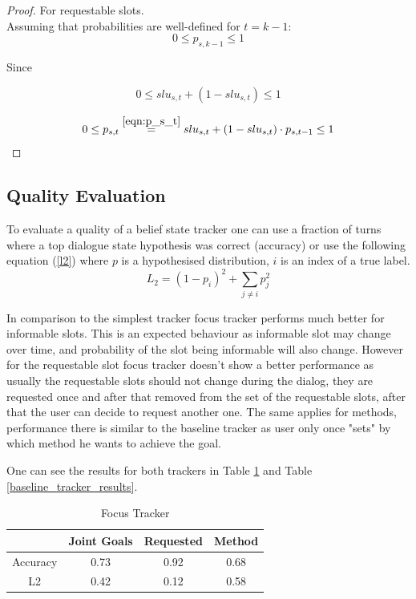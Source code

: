 \documentclass[12pt,titlepage,a4paper]{article}
\begin{document}
\begin{proof}
    For requestable slots.\\
    
    Assuming that probabilities are well-defined for $t = k-1$:
    \begin{equation}
        0 \leq p_{s,k-1} \leq 1
    \end{equation}
    
    Since
    
    \begin{equation}
        0 \leq slu_{s,t} + (1 - slu_{s,t}) \leq 1
    \end{equation}

    \begin{equation}
        0 \leq p_{s,t} \overset{\ref{eqn:p_s_t}}{=} slu_{s,t} + (1 - slu_{s,t}) \cdot p_{s,t-1} \leq 1
    \end{equation}
\end{proof}

\subsection{Quality Evaluation}
To evaluate a quality of a belief state tracker one can use a fraction of turns where a top dialogue state hypothesis was correct (accuracy) or use the following equa\-tion (\ref{l2}) where $p$ is a hypothesised distribution, $i$ is an index of a true label. 
\begin{equation}
    L_2 = (1-p_i)^2 + \sum_{j \neq i} p_j^2
    \label{l2}
\end{equation}

In comparison to the simplest tracker focus tracker performs much better for informable slots. This is an expected behaviour as informable slot may change over time, and probabi\-lity of the slot being informable will also change. However for the requestable slot focus tracker doesn't show a better performance as usually the requestable slots should not change during the dialog, they are requested once and after that removed from the set of the requestable slots, after that the user can decide to request another one. The same applies for methods, performance there is similar to the baseline tracker as user only once "sets" by which method he wants to achieve the goal.

One can see the results for both trackers in Table \ref{focus_tracker_results} and Table \ref{baseline_tracker_results}.
    \begin{table}[ht]
        \centering
        \begin{tabular}{|c c c c|}
        \hline
                    & Joint Goals & Requested & Method \\
        \hline
        Accuracy   & 0.73        & 0.92      & 0.68 \\ 
        L2         & 0.42        & 0.12      & 0.58 \\
        \hline
        \end{tabular}
        \caption{Focus Tracker}
        \label{focus_tracker_results}
    \end{table}
\end{document}
